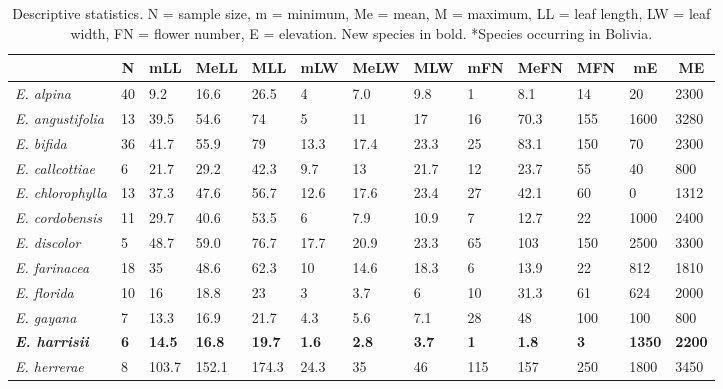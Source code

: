 \documentclass[fleqn,10pt,lineno]{wlpeerj} %
\begin{document}
\begin{table}[hbt]
[tbp]
\tiny
\begin{center}
\caption{\label{tab:widgets}Descriptive statistics. N = sample size, m = minimum, Me = mean, M = maximum, LL = leaf length, LW = leaf width, FN = flower number, E = elevation. New species in bold. *Species occurring in Bolivia.}
\begin{tabular}{lllllllllllll}
\toprule
& \multicolumn{1}{c}{N} & \multicolumn{1}{c}{mLL} & \multicolumn{1}{c}{MeLL} & \multicolumn{1}{c}{MLL} & \multicolumn{1}{c}{mLW} & \multicolumn{1}{c}{MeLW} & \multicolumn{1}{c}{MLW} & \multicolumn{1}{c}{mFN} & \multicolumn{1}{c}{MeFN} & \multicolumn{1}{c}{MFN} & \multicolumn{1}{c}{mE} & \multicolumn{1}{c}{ME}\\
\midrule
\emph{E. alpina} & 40 & 9.2 & 16.6 & 26.5 & 4 & 7.0 & 9.8 & 1 & 8.1 & 14 & 20 & 2300\\
\emph{E. angustifolia} & 13 & 39.5 & 54.6 & 74 & 5 & 11 & 17 & 16 & 70.3 & 155 & 1600 & 3280\\
\emph{E. bifida} & 36 & 41.7 & 55.9 & 79 & 13.3 & 17.4 & 23.3 & 25 & 83.1 & 150 & 70 & 2300\\
\emph{E. callcottiae} & 6 & 21.7 & 29.2 & 42.3 & 9.7 & 13 & 21.7 & 12 & 23.7 & 55 & 40 & 800\\
\emph{E. chlorophylla} & 13 & 37.3 & 47.6 & 56.7 & 12.6 & 17.6 & 23.4 & 27 & 42.1 & 60 & 0 & 1312\\
\emph{E. cordobensis} & 11 & 29.7 & 40.6 & 53.5 & 6 & 7.9 & 10.9 & 7 & 12.7 & 22 & 1000 & 2400\\
\emph{E. discolor} & 5 & 48.7 & 59.0 & 76.7 & 17.7 & 20.9 & 23.3 & 65 & 103 & 150 & 2500 & 3300\\
\emph{E. farinacea} & 18 & 35 & 48.6 & 62.3 & 10 & 14.6 & 18.3 & 6 & 13.9 & 22 & 812 & 1810\\
\emph{E. florida} & 10 & 16 & 18.8 & 23 & 3 & 3.7 & 6 & 10 & 31.3 & 61 & 624 & 2000\\
\emph{E. gayana} & 7 & 13.3 & 16.9 & 21.7 & 4.3 & 5.6 & 7.1 & 28 & 48 & 100 & 100 & 800\\
\textbf{\emph{E. harrisii}} & \textbf{6} & \textbf{14.5} & \textbf{16.8} & \textbf{19.7} & \textbf{1.6} & \textbf{2.8} & \textbf{3.7} & \textbf{1} & \textbf{1.8} & \textbf{3} & \textbf{1350} & \textbf{2200}\\
\emph{E. herrerae} & 8 & 103.7 & 152.1 & 174.3 & 24.3 & 35 & 46 & 115 & 157 & 250 & 1800 & 3450\\

\end{tabular}
\end{center}
\end{table}
\end{document}
